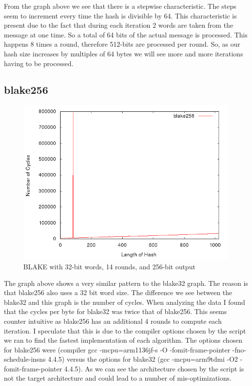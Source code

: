 \documentclass[10pt,a4paper]{article}
\begin{document}
From the graph above we see that there is a stepwise characteristic. The steps seem to increment every time the hash is divisible by 64. 
This characteristic is present due to the fact that during each iteration 2 words are taken from the message at one time. So a total of 64 bits
of the actual message is processed. This happens 8 times a round, therefore 512-bits are processed per round. So, as our hash size increases by 
multiples of 64 bytes we will see more and more iterations having to be processed.

\subsection{blake256}
    \begin{figure}[H]
        \begin{center}
            \includegraphics[scale=0.5]{images/blake256.png} 
            \caption{BLAKE with 32-bit words, 14 rounds, and 256-bit output}
        \end{center}
    \end{figure}

The graph above shows a very similar pattern to the blake32 graph. The reason is that blake256 also uses a 32 bit word size. The difference we
see between the blake32 and this graph is the number of cycles. When analyzing the data I found that the cycles per byte for blake32 was twice
that of blake256. This seems counter intuitive as blake256 has an additional 4 rounds to compute each iteration. I speculate that this is
due to the compiler options chosen by the script we ran to find the fastest implementation of each algorithm. The options chosen for blake256 were 
(compiler gcc -mcpu=arm1136jf-s -O -fomit-frame-pointer -fno-schedule-insns 4.4.5) versus the options for blake32 
(gcc -mcpu=arm9tdmi -O2 -fomit-frame-pointer 4.4.5). As we can see the architecture chosen by the script is not the target architecture and could
lead to a number of mis-optimizations. 
\end{document}
